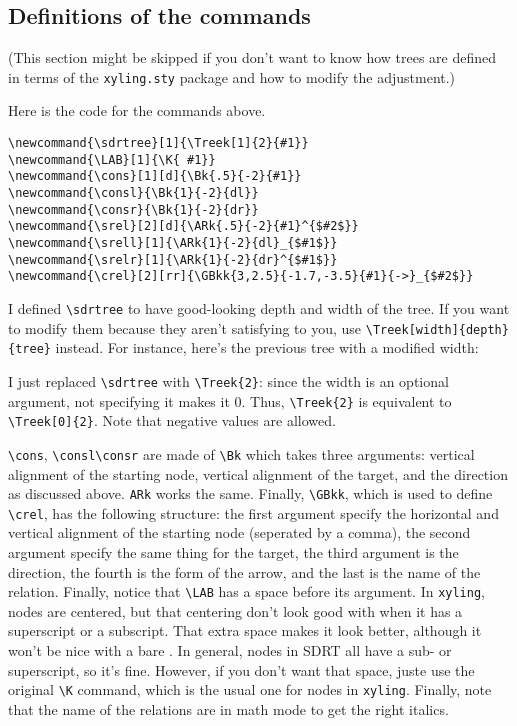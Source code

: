 \documentclass[a4paper]{article}
\begin{document}
\subsection{Definitions of the commands}
(This section might be skipped if you don't want to know how trees are defined in terms of the \verb+xyling.sty+ package and how to modify the adjustment.)

Here is the code for the commands above.
\begin{verbatim}
\newcommand{\sdrtree}[1]{\Treek[1]{2}{#1}}
\newcommand{\LAB}[1]{\K{ #1}}
\newcommand{\cons}[1][d]{\Bk{.5}{-2}{#1}}
\newcommand{\consl}{\Bk{1}{-2}{dl}}
\newcommand{\consr}{\Bk{1}{-2}{dr}}
\newcommand{\srel}[2][d]{\ARk{.5}{-2}{#1}^{$#2$}}
\newcommand{\srell}[1]{\ARk{1}{-2}{dl}_{$#1$}}
\newcommand{\srelr}[1]{\ARk{1}{-2}{dr}^{$#1$}}
\newcommand{\crel}[2][rr]{\GBkk{3,2.5}{-1.7,-3.5}{#1}{->}_{$#2$}}
\end{verbatim}
I defined \verb+\sdrtree+ to have good-looking depth and width of the tree. If you want to modify them because they aren't satisfying to you, use \verb+\Treek[width]{depth}{tree}+ instead. For instance, here's the previous tree with a modified width:	
\begin{center}
\end{center}
I just replaced \verb+\sdrtree+ with \verb+\Treek{2}+: since the width is an optional argument, not specifying it makes it 0. Thus, \verb+\Treek{2}+ is equivalent to \verb+\Treek[0]{2}+. Note that negative values are allowed. 

\verb+\cons+, \verb+\consl+\verb+\consr+ are made of \verb+\Bk+ which takes three arguments: vertical alignment of the starting node, vertical alignment of the target, and the direction as discussed above. \verb+ARk+ works the same. Finally, \verb+\GBkk+, which is used to define \verb+\crel+, has the following structure: the first argument specify the horizontal and vertical alignment of the starting node (seperated by a comma), the second argument specify the same thing for the target, the third argument is the direction, the fourth is the form of the arrow, and the last is the name of the relation. Finally, notice that \verb+\LAB+ has a space before its argument. In \verb+xyling+, nodes are centered, but that centering don't look good with \lab{} when it has a superscript or a subscript. That extra space makes it look better, although it won't be nice with a bare \lab{}. In general, nodes in SDRT all have a sub- or superscript, so it's fine. However, if you don't want that space, juste use the original \verb+\K+ command, which is the usual one for nodes in \verb+xyling+. Finally, note that the name of the relations are in math mode to get the right italics.
\end{document}
